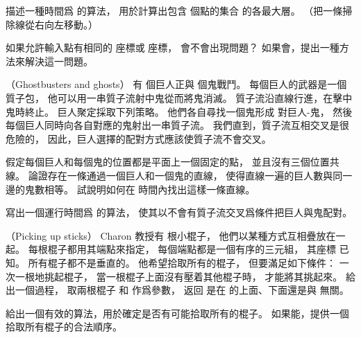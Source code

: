\startANSWER
{}
\stopANSWER

\startigBase[continue]\startitem
描述一種時間爲  的算法，
用於計算出包含  個點的集合  的各最大層。
（\hint 把一條掃除線從右向左移動。）
\stopitem\stopigBase

\startANSWER
{}
\stopANSWER

\startigBase[continue]\startitem
如果允許輸入點有相同的  座標或  座標，
會不會出現問題？
如果會，提出一種方法來解決這一問題。
\stopitem\stopigBase

\startANSWER
{}
\stopANSWER

\stopPROBLEM

\startPROBLEM
（Ghostbusters and ghosts）
有  個巨人正與  個鬼戰鬥。
每個巨人的武器是一個質子包，
他可以用一串質子流射中鬼從而將鬼消滅。
質子流沿直線行進，在擊中鬼時終止。
巨人聚定採取下列策略。
他們各自尋找一個鬼形成  對巨人-鬼，
然後每個巨人同時向各自對應的鬼射出一串質子流。
我們直到，質子流互相交叉是很危險的，
因此，巨人選擇的配對方式應該使質子流不會交叉。

假定每個巨人和每個鬼的位置都是平面上一個固定的點，
並且沒有三個位置共線。
\startigBase[a]\startitem
論證存在一條通過一個巨人和一個鬼的直線，
使得直線一遍的巨人數與同一邊的鬼數相等。
試說明如何在  時間內找出這樣一條直線。
\stopitem\stopigBase

\startANSWER
{}
\stopANSWER

\startigBase[continue]\startitem
寫出一個運行時間爲  的算法，
使其以不會有質子流交叉爲條件把巨人與鬼配對。
\stopitem\stopigBase

\startANSWER
{}
\stopANSWER
\stopPROBLEM

\startPROBLEM
（Picking up sticks）
 Charon 教授有  根小棍子，
他們以某種方式互相疊放在一起。
每根棍子都用其端點來指定，
每個端點都是一個有序的三元組，
其座標  已知。
所有棍子都不是垂直的。
他希望拾取所有的棍子，
但要滿足如下條件：
一次一根地挑起棍子，
當一根棍子上面沒有壓着其他棍子時，
才能將其挑起來。
\startigBase[a]\startitem
給出一個過程，
取兩根棍子  和  作爲參數，
返回  是在  的上面、下面還是與  無關。
\stopitem\stopigBase

\startANSWER
{}
\stopANSWER

\startigBase[continue]\startitem
給出一個有效的算法，用於確定是否有可能拾取所有的棍子。
如果能，提供一個拾取所有棍子的合法順序。
\stopitem\stopigBase

\startANSWER
{}
\stopANSWER
\stopPROBLEM

